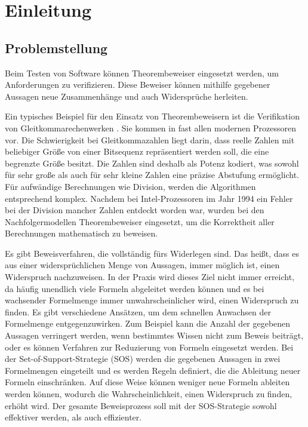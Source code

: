 
\chapter{Einleitung}
\section{Problemstellung}
Beim Testen von Software können Theorembeweiser eingesetzt werden, um Anforderungen zu verifizieren. Diese Beweiser können mithilfe gegebener Aussagen neue Zusammenhänge und auch Widersprüche herleiten.

Ein typisches Beispiel für den Einsatz von Theorembeweisern ist die Verifikation von Gleitkommarechenwerken \cite{Harrison2006Float}. Sie kommen in fast allen modernen Prozessoren vor. Die Schwierigkeit bei Gleitkommazahlen liegt darin, dass reelle Zahlen mit beliebiger Größe von einer Bitsequenz repräsentiert werden soll, die eine begrenzte Größe besitzt. Die Zahlen sind deshalb als Potenz kodiert, was sowohl für sehr große als auch für sehr kleine Zahlen eine präzise Abstufung ermöglicht. Für aufwändige Berechnungen wie Division, werden die Algorithmen entsprechend komplex. Nachdem bei Intel-Prozessoren im Jahr 1994 ein Fehler bei der Division mancher Zahlen entdeckt worden war, wurden bei den Nachfolgermodellen Theorembeweiser eingesetzt, um die Korrektheit aller Berechnungen mathematisch zu beweisen.

Es gibt Beweisverfahren, die vollständig fürs Widerlegen sind. Das heißt, dass es aus einer widersprüchlichen Menge von Aussagen, immer möglich ist, einen Widerspruch nachzuweisen. In der Praxis wird dieses Ziel nicht immer erreicht, da häufig unendlich viele Formeln abgeleitet werden können und es bei wachsender Formelmenge immer unwahrscheinlicher wird, einen Widerspruch zu finden. Es gibt verschiedene Ansätzen, um dem schnellen Anwachsen der Formelmenge entgegenzuwirken. Zum Beispiel kann die Anzahl der gegebenen Aussagen verringert werden, wenn bestimmtes Wissen nicht zum Beweis beiträgt, oder es können Verfahren zur Reduzierung von Formeln eingesetzt werden. Bei der Set-of-Support-Strategie (SOS) werden die gegebenen Aussagen in zwei Formelmengen eingeteilt und es werden Regeln definiert, die die Ableitung neuer Formeln einschränken. Auf diese Weise können weniger neue Formeln ableiten werden können, wodurch die Wahrscheinlichkeit, einen Widerspruch zu finden, erhöht wird. Der gesamte Beweisprozess soll mit der SOS-Strategie sowohl effektiver werden, als auch effizienter.

